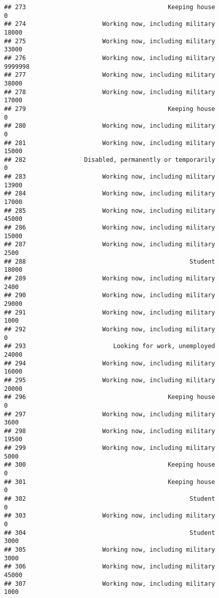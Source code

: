 \documentclass[]{book}
\theoremstyle{definition}
\theoremstyle{definition}
\theoremstyle{remark}
\begin{document}
\begin{verbatim}
## 273                                       Keeping house               0
## 274                     Working now, including military           18000
## 275                     Working now, including military           33000
## 276                     Working now, including military         9999998
## 277                     Working now, including military           38000
## 278                     Working now, including military           17000
## 279                                       Keeping house               0
## 280                     Working now, including military               0
## 281                     Working now, including military           15000
## 282                Disabled, permanently or temporarily               0
## 283                     Working now, including military           13900
## 284                     Working now, including military           17000
## 285                     Working now, including military           45000
## 286                     Working now, including military           15000
## 287                     Working now, including military            2500
## 288                                             Student           18000
## 289                     Working now, including military            2400
## 290                     Working now, including military           29000
## 291                     Working now, including military            1000
## 292                     Working now, including military               0
## 293                        Looking for work, unemployed           24000
## 294                     Working now, including military           16000
## 295                     Working now, including military           20000
## 296                                       Keeping house               0
## 297                     Working now, including military            3600
## 298                     Working now, including military           19500
## 299                     Working now, including military            5000
## 300                                       Keeping house               0
## 301                                       Keeping house               0
## 302                                             Student               0
## 303                     Working now, including military               0
## 304                                             Student            3000
## 305                     Working now, including military            3000
## 306                     Working now, including military           45000
## 307                     Working now, including military            1000

\end{verbatim}
\end{document}
